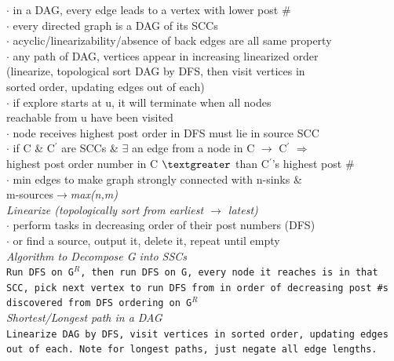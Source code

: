 \documentclass[10pt,landscape]{article}
\begin{document}
\begin{multicols}{3}
{\hspace{5pt} $\cdot$ in a DAG, every edge leads to a vertex with lower post \#\\
\hspace{5pt} $\cdot$ every directed graph is a DAG of its SCCs\\
\hspace{5pt} $\cdot$ acyclic/linearizability/absence of back edges are all same property\\
\hspace{5pt} $\cdot$ any path of DAG, vertices appear in increasing linearized order\\\hspace{10pt}(linearize, topological sort DAG by DFS, then visit vertices in \\\hspace{10pt}sorted order, updating edges out of each)\\
\hspace{5pt} $\cdot$ if explore starts at u, it will terminate when all nodes \\\hspace{10pt}reachable from u have been visited\\
\hspace{5pt} $\cdot$ node receives highest post order in DFS must lie in source SCC\\
\hspace{5pt} $\cdot$ if C \& C$^{'}$ are SCCs \& $\exists$ an edge from a node in C $\rightarrow$ C$^{'}$ $\Rightarrow$ \\\hspace{12pt}highest post order number in C $\textgreater$ than C$^{'}$'s highest post \#\\
\hspace{5pt} $\cdot$ min edges to make graph strongly connected with n-sinks \& \\\hspace{12pt}m-sources$\rightarrow${\it max(n,m)}\\
{\it Linearize (topologically sort from earliest $\rightarrow$ latest)}\\
\hspace{5pt} $\cdot$ perform tasks in decreasing order of their post numbers (DFS)\\
\hspace{5pt} $\cdot$ or find a source, output it, delete it, repeat until empty\\
{\it Algorithm to Decompose G into SSCs}\\
{\addtolength{\leftskip}{4mm}
\texttt{Run DFS on G$^{R}$, then run DFS on G, every node it reaches is in that SCC, pick next vertex to run DFS from in order of decreasing post \#s discovered from DFS ordering on G$^{R}$}\\}
{\it Shortest/Longest path in a DAG}\\
{\addtolength{\leftskip}{4mm}
\texttt{Linearize DAG by DFS, visit vertices in sorted order, updating edges out of each. Note for longest paths, just negate all edge lengths.}\\}}


\end{multicols}
\end{document}
